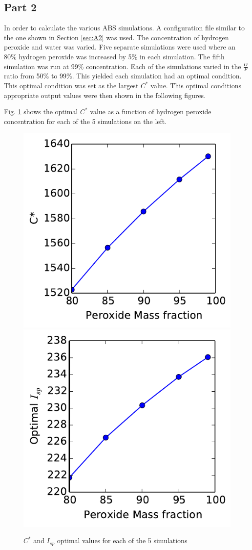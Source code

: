 \documentclass[cleanfoot,cleanhead,onecolumn,12pt,notitlepage]{asme2e}
\begin{document}
\subsection{Part 2}

In order to calculate the various ABS simulations.  A configuration file similar to the one shown in Section \ref{sec:A2} was used.  The concentration of hydrogen peroxide and water was varied.  Five separate simulations were used where an 80\% hydrogen peroxide was increased by 5\% in each simulation.  The fifth simulation was run at 99\% concentration.  Each of the simulations varied in the $\frac{O}{F}$ ratio from 50\% to 99\%.  This yielded each simulation had an optimal condition.  This optimal condition was set as the largest $C^*$ value.  This optimal conditions appropriate output values were then shown in the following figures.

Fig. \ref{fig:2-c} shows the optimal $C^*$ value as a function of hydrogen peroxide concentration for each of the 5 simulations on the left.

\begin{figure}[h!]
    \begin{center}
        \includegraphics[width=0.45\linewidth]{../Plot_CEA/Part2/Part2_C_star.pdf}
        \includegraphics[width=0.45\linewidth]{../Plot_CEA/Part2/Part2_OptimalIsp.pdf}
        \caption{$C^*$ and $I_{sp}$ optimal values for each of the 5 simulations}
        \label{fig:2-c}
    \end{center}
\end{figure}
\end{document}
